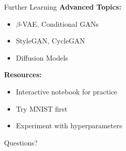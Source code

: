 \documentclass[aspectratio=169,10pt]{beamer}
\begin{document}
\begin{frame}{Further Learning}
\textbf{Advanced Topics:}
\begin{itemize}
\item $\beta$-VAE, Conditional GANs
\item StyleGAN, CycleGAN
\item Diffusion Models
\end{itemize}

\textbf{Resources:}
\begin{itemize}
\item Interactive notebook for practice
\item Try MNIST first
\item Experiment with hyperparameters
\end{itemize}
\end{frame}

\begin{frame}[standout]
Questions?
\end{frame}
\end{document}
